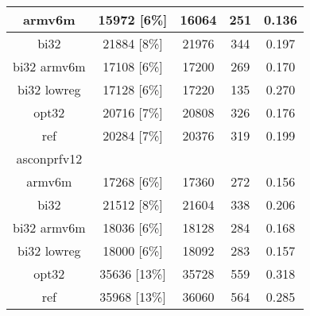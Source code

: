 \begin{table}[h]
\begin{tabular}{|c|c|c|c|c|}
        \hline
        armv6m & 15972 [6\%] & 16064 & 251 & 0.136 \\
        \hline
        bi32 & 21884 [8\%] & 21976 & 344 & 0.197 \\
        \hline
        bi32 armv6m & 17108 [6\%] & 17200 & 269 & 0.170 \\
        \hline
        bi32 lowreg & 17128 [6\%] & 17220 & 135 & 0.270 \\
        \hline
        opt32 & 20716 [7\%] & 20808 & 326 & 0.176 \\
        \hline
        ref & 20284 [7\%] & 20376 & 319 & 0.199 \\
        \hline
        asconprfv12 & & & & \\
        \hline
        armv6m & 17268 [6\%] & 17360 & 272 & 0.156 \\
        \hline
        bi32 & 21512 [8\%] & 21604 & 338 & 0.206 \\
        \hline
        bi32 armv6m & 18036 [6\%] & 18128 & 284 & 0.168 \\
        \hline
        bi32 lowreg & 18000 [6\%] & 18092 & 283 & 0.157 \\
        \hline
        opt32 & 35636 [13\%] & 35728 & 559 & 0.318 \\
        \hline
        ref & 35968 [13\%] & 36060 & 564 & 0.285 \\
        \hline
    \end{tabular}
\end{table}

